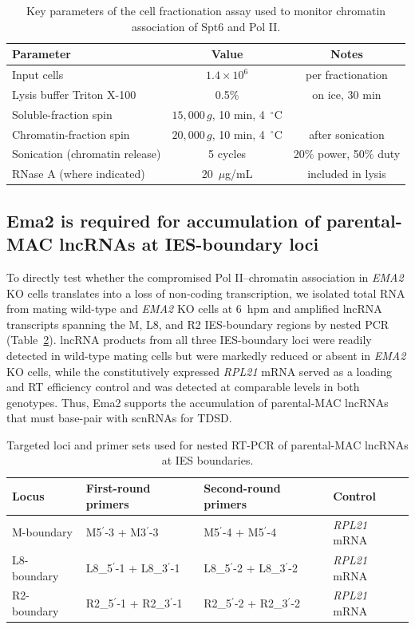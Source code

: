 \documentclass[11pt,a4paper]{article}
\begin{document}
\begin{table}[h]
\centering
\caption{Key parameters of the cell fractionation assay used to monitor chromatin association of Spt6 and Pol II.}
\label{tab:frac}
\begin{tabular}{lcc}
\toprule
Parameter & Value & Notes \\
\midrule
Input cells                       & $1.4\times10^{6}$ & per fractionation \\
Lysis buffer Triton X-100         & 0.5\%             & on ice, 30 min \\
Soluble-fraction spin             & $15{,}000\,g$, 10 min, 4~$^\circ$C & \\
Chromatin-fraction spin           & $20{,}000\,g$, 10 min, 4~$^\circ$C & after sonication \\
Sonication (chromatin release)    & 5 cycles          & 20\% power, 50\% duty \\
RNase A (where indicated)         & 20~$\mu$g/mL      & included in lysis \\
\bottomrule
\end{tabular}
\end{table}

\subsection{Ema2 is required for accumulation of parental-MAC lncRNAs at IES-boundary loci}
To directly test whether the compromised Pol II--chromatin association in \textit{EMA2} KO cells translates into a loss of non-coding transcription, we isolated total RNA from mating wild-type and \textit{EMA2} KO cells at 6~hpm and amplified lncRNA transcripts spanning the M, L8, and R2 IES-boundary regions by nested PCR (Table~\ref{tab:lncrna}). lncRNA products from all three IES-boundary loci were readily detected in wild-type mating cells but were markedly reduced or absent in \textit{EMA2} KO cells, while the constitutively expressed \textit{RPL21} mRNA served as a loading and RT efficiency control and was detected at comparable levels in both genotypes. Thus, Ema2 supports the accumulation of parental-MAC lncRNAs that must base-pair with scnRNAs for TDSD.

\begin{table}[h]
\centering
\caption{Targeted loci and primer sets used for nested RT-PCR of parental-MAC lncRNAs at IES boundaries.}
\label{tab:lncrna}
\begin{tabular}{llll}
\toprule
Locus & First-round primers & Second-round primers & Control \\
\midrule
M-boundary   & M5$^\prime$-3 + M3$^\prime$-3     & M5$^\prime$-4 + M5$^\prime$-4     & \textit{RPL21} mRNA \\
L8-boundary  & L8\_5$^\prime$-1 + L8\_3$^\prime$-1 & L8\_5$^\prime$-2 + L8\_3$^\prime$-2 & \textit{RPL21} mRNA \\
R2-boundary  & R2\_5$^\prime$-1 + R2\_3$^\prime$-1 & R2\_5$^\prime$-2 + R2\_3$^\prime$-2 & \textit{RPL21} mRNA \\
\bottomrule
\end{tabular}
\end{table}
\end{document}
